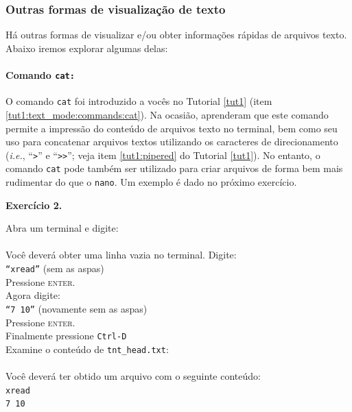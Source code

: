 \begin{refsection}
\subsubsection{Outras formas de visualização de texto}\label{tut2:text:editors:texttools}

Há outras formas de visualizar e/ou obter informações rápidas de arquivos texto. Abaixo iremos explorar algumas delas:\\
\paragraph{Comando \texttt{cat:}}\label{tut2:text:editors:texttools:cat}
O comando \texttt{cat} foi introduzido a vocês no Tutorial \ref{tut1} (item \ref{tut1:text_mode:commands:cat}). Na ocasião, aprenderam que este comando permite a impressão do conteúdo de arquivos texto no terminal, bem como seu uso para concatenar arquivos textos utilizando os caracteres de direcionamento (\textit{i.e.}, ``\texttt{>}'' e ``\texttt{>>}''; veja item \ref{tut1:pipered} do Tutorial \ref{tut1}). No entanto, o comando \texttt{cat} pode também ser utilizado para criar arquivos de forma bem mais rudimentar do que o \texttt{nano}. Um exemplo é dado no próximo exercício.\\

\begin{blackBlock}{\textbf{Exercício 2.}}\label{tut2:ex:2.\arabic{ex}}

Abra um terminal e digite:\\
\\

Você deverá obter uma linha vazia no terminal. Digite:\\
\texttt{``xread''} (sem as aspas)\\
Pressione \textsc{enter}.\\
Agora digite:\\
\texttt{``7 10''} (novamente sem as aspas)\\
Pressione \textsc{enter}.\\
Finalmente pressione  \texttt{Ctrl-D}\\

Examine o conteúdo de \texttt{tnt\_head.txt}:\\
\\

Você deverá ter obtido um arquivo com o seguinte conteúdo:\\
\texttt{xread}\\
\texttt{7 10}\\
\end{blackBlock}


\end{refsection}
